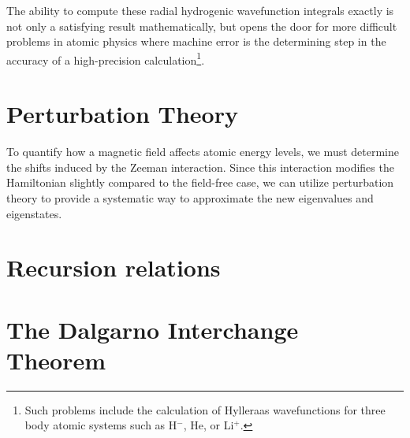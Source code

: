             The ability to compute these radial hydrogenic wavefunction integrals exactly is not only a satisfying result mathematically, but opens the door for more difficult problems in atomic physics where machine error is the determining step in the accuracy of a high-precision calculation\footnote{Such problems include the calculation of Hylleraas wavefunctions for three body atomic systems such as H$^-$, He, or Li$^+$.}.
            
            

    \section{Perturbation Theory} \label{sec:Perturbation_Theory}
        To quantify how a magnetic field affects atomic energy levels, we must determine the shifts induced by the Zeeman interaction. Since this interaction modifies the Hamiltonian slightly compared to the field-free case, we can utilize perturbation theory to provide a systematic way to approximate the new eigenvalues and eigenstates.
    \section{Recursion relations} \label{sec:Recursion_Relations}
    \section{The Dalgarno Interchange Theorem} \label{sec:Dalgarno_Interchange_Theorem}
    
    